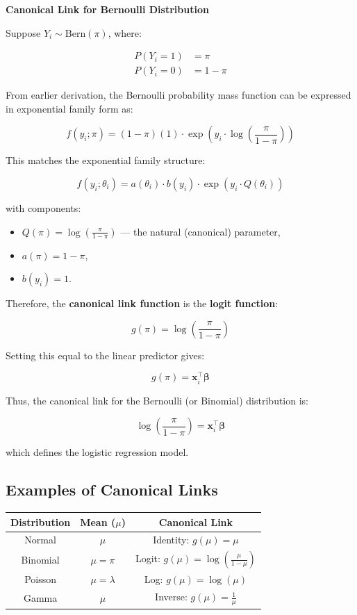 \documentclass[12pt,a4paper]{article}
\begin{document}
\begin{example}
\textbf{Canonical Link for Bernoulli Distribution}

Suppose \( Y_i \sim \text{Bern}(\pi) \), where:

\begin{align*}
P(Y_i = 1) &= \pi \\
P(Y_i = 0) &= 1 - \pi
\end{align*}

From earlier derivation, the Bernoulli probability mass function can be expressed in exponential family form as:

\[
f(y_i; \pi) = (1 - \pi)(1) \cdot \exp\left( y_i \cdot \log\left( \frac{\pi}{1 - \pi} \right) \right)
\]

This matches the exponential family structure:

\[
f(y_i; \theta_i) = a(\theta_i) \cdot b(y_i) \cdot \exp\left( y_i \cdot Q(\theta_i) \right)
\]

with components:

\begin{itemize}
  \item \( Q(\pi) = \log\left( \frac{\pi}{1 - \pi} \right) \) — the natural (canonical) parameter,
  \item \( a(\pi) = 1 - \pi \),
  \item \( b(y_i) = 1 \).
\end{itemize}

Therefore, the \textbf{canonical link function} is the \textbf{logit function}:

\[
g(\pi) = \log\left( \frac{\pi}{1 - \pi} \right)
\]

Setting this equal to the linear predictor gives:

\[
g(\pi) = \mathbf{x}_i^\top \boldsymbol{\beta}
\]

Thus, the canonical link for the Bernoulli (or Binomial) distribution is:

\[
\log\left( \frac{\pi}{1 - \pi} \right) = \mathbf{x}_i^\top \boldsymbol{\beta}
\]

which defines the logistic regression model.

\end{example}

\subsection*{Examples of Canonical Links}

\begin{tabular}{|c|c|c|}
\hline
\textbf{Distribution} & \textbf{Mean} (\( \mu \)) & \textbf{Canonical Link} \\
\hline
Normal & \( \mu \) & Identity: \( g(\mu) = \mu \) \\
Binomial & \( \mu = \pi \) & Logit: \( g(\mu) = \log\left( \frac{\mu}{1 - \mu} \right) \) \\
Poisson & \( \mu = \lambda \) & Log: \( g(\mu) = \log(\mu) \) \\
Gamma & \( \mu \) & Inverse: \( g(\mu) = \frac{1}{\mu} \) \\
\hline
\end{tabular}
\end{document}
